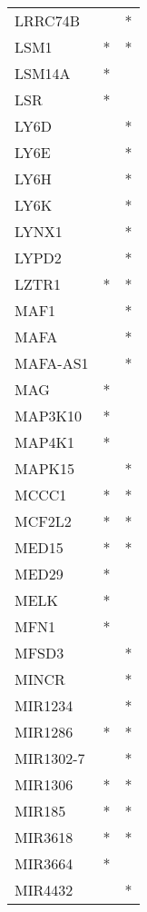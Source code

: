 \begin{longtable}{lcc}
LRRC74B      &           &       * \\
LSM1         &         * &       * \\
LSM14A       &         * &         \\
LSR          &         * &         \\
LY6D         &           &       * \\
LY6E         &           &       * \\
LY6H         &           &       * \\
LY6K         &           &       * \\
LYNX1        &           &       * \\
LYPD2        &           &       * \\
LZTR1        &         * &       * \\
MAF1         &           &       * \\
MAFA         &           &       * \\
MAFA-AS1     &           &       * \\
MAG          &         * &         \\
MAP3K10      &         * &         \\
MAP4K1       &         * &         \\
MAPK15       &           &       * \\
MCCC1        &         * &       * \\
MCF2L2       &         * &       * \\
MED15        &         * &       * \\
MED29        &         * &         \\
MELK         &         * &         \\
MFN1         &         * &         \\
MFSD3        &           &       * \\
MINCR        &           &       * \\
MIR1234      &           &       * \\
MIR1286      &         * &       * \\
MIR1302-7    &           &       * \\
MIR1306      &         * &       * \\
MIR185       &         * &       * \\
MIR3618      &         * &       * \\
MIR3664      &         * &         \\
MIR4432      &           &       * \\

\end{longtable}
